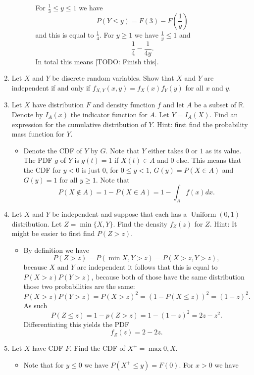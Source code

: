 \documentclass{article}
\begin{document}
\begin{enumerate}
\begin{enumerate}
\begin{itemize}
					For $\frac{1}{3} \leq y \leq 1$ we have
					$$
					P\left(Y \leq y\right) = F(3) - F\left(\frac{1}{y}\right)
					$$
					and this is equal to $\frac{1}{4}$. For $y \geq 1$ we have $\frac{1}{y} \leq 1$ and
					$$
					\frac{1}{4} - \frac{1}{4y}.
					$$
					In total this means [TODO: Finish this].
				\end{itemize}
		\end{enumerate}
	\item Let $X$ and $Y$ be discrete random variables. Show that $X$ and $Y$ are independent if and only if $f_{X, Y}(x, y) = f_X(x)f_Y(y)$ for all $x$ and $y$.
	\item Let $X$ have distribution $F$ and density function $f$ and let $A$ be a subset of $\mathbb{R}$. Denote by $I_A(x)$ the indicator function for $A$. Let $Y = I_A(X)$. Find an expression for the cumulative distribution of $Y$. Hint: first find the probability mass function for $Y$.
		\begin{itemize}
			\item Denote the CDF of $Y$ by $G$. Note that $Y$ either takes $0$ or $1$ as its value. The PDF $g$ of $Y$ is $g(t) = 1$ if $X(t) \in A$ and $0$ else. This means that the CDF for $y < 0$ is just $0$, for $0 \leq y < 1$, $G(y) = P(X \in A)$ and $G(y) = 1$ for all $y \geq 1$. Note that
			$$
			P(X \notin A) = 1 - P(X \in A) = 1 - \int_A f(x) dx.
			$$
		\end{itemize}
	\item Let $X$ and $Y$ be independent and suppose that each has a $\operatorname{Uniform}(0, 1)$ distribution. Let $Z = \min\{X, Y\}$. Find the density $f_Z(z)$ for $Z$. Hint: It might be easier to first find $P(Z > z)$.
		\begin{itemize}
			\item By definition we have 
			$$
			P(Z > z) = P(\min{X, Y} > z) = P(X > z, Y > z),$$
			because $X$ and $Y$ are independent it follows that this is equal to $P(X > z)P(Y > z)$, because both of those have the same distribution those two probabilities are the same:
			$$
			P(X > z)P(Y > z) = P(X > z)^2 = (1 - P(X \leq z))^2 = (1 - z)^2.
			$$
			As such
			$$
			P(Z \leq z) = 1 - p(Z > z) = 1 - (1 - z)^2 = 2z - z^2.
			$$
			Differentiating this yields the PDF
			$$
			f_Z(z) = 2 - 2z.
			$$
		\end{itemize}
	\item Let $X$ have CDF $F$. Find the CDF of $X^+ = \max{0, X}$.
		\begin{itemize}
			\item Note that for $y \leq 0$ we have $P(X^+ \leq y) = F(0)$. For $x > 0$ we have

\end{itemize}
\end{enumerate}
\end{document}
